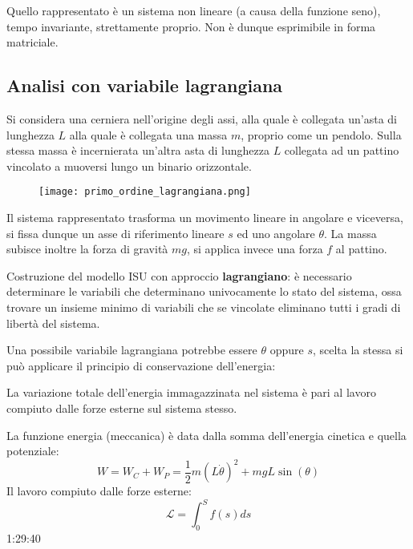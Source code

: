 Quello rappresentato è un sistema non lineare (a causa della funzione seno),
tempo invariante, strettamente proprio. Non è dunque esprimibile in forma
matriciale.

\newpage
\subsection{Analisi con variabile lagrangiana}
Si considera una cerniera nell'origine degli assi, alla quale è collegata
un'asta di lunghezza $L$ alla quale è collegata una massa $m$, proprio come un
pendolo. Sulla stessa massa è incernierata un'altra asta di lunghezza $L$
collegata ad un pattino vincolato a muoversi lungo un binario orizzontale.
\begin{figure}[h]
 \centering
 \texttt{[image: primo\_ordine\_lagrangiana.png]}
 \label{Fig.:variabile_lagrangiana}
\end{figure}

Il sistema rappresentato trasforma un movimento lineare in angolare e
viceversa, si fissa dunque un asse di riferimento lineare $s$ ed uno angolare
$\theta$. La massa subisce inoltre la forza di gravità $mg$, si applica invece
una forza $f$ al pattino.

Costruzione del modello ISU con approccio \textbf{lagrangiano}:
è necessario determinare le variabili che determinano univocamente lo stato del
sistema, ossa trovare un insieme minimo di variabili che se vincolate eliminano
tutti i gradi di libertà del sistema.

Una possibile variabile lagrangiana potrebbe essere $\theta$ oppure $s$, scelta
la stessa si può applicare il principio di conservazione dell'energia:

\begin{emph}
La variazione totale dell'energia immagazzinata nel sistema è pari al lavoro
compiuto dalle forze esterne sul sistema stesso.
\end{emph}

La funzione energia (meccanica) è data dalla somma dell'energia cinetica e
quella potenziale:
$$
W = W_C + W_P = \frac{1}{2}m(L\dot\theta)^2 + mgL\sin(\theta)
$$
Il lavoro compiuto dalle forze esterne:
$$
\mathcal{L} = \int_0^S f(s)ds
$$
1:29:40
